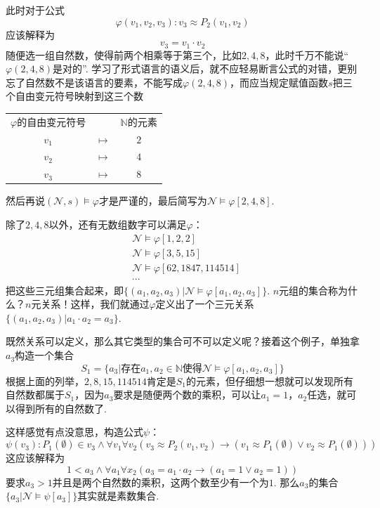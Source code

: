 此时对于公式
\[\varphi(v_1,v_2,v_3): v_3 \approx P_2(v_1,v_2)\]
应该解释为
\[v_3 = v_1 \cdot v_2\]
随便选一组自然数，使得前两个相乘等于第三个，比如\(2,4,8\)，此时千万不能说“\(\varphi(2,4,8)\)是对的”. 学习了形式语言的语义后，就不应轻易断言公式的对错，更别忘了自然数不是该语言的要素，不能写成\(\varphi(2,4,8)\)，而应当规定赋值函数\(s\)把三个自由变元符号映射到这三个数
\begin{center}
    \begin{tabular}{ccc}
        \(\varphi\)的自由变元符号 & & \(\mathbb{N}\)的元素 \\
        \(v_1\) & \(\longmapsto\) & \(2\) \\
        \(v_2\) & \(\longmapsto\) & \(4\) \\
        \(v_3\) & \(\longmapsto\) & \(8\)
    \end{tabular}
\end{center}
然后再说\((\mathcal{N},s) \vDash \varphi\)才是严谨的，最后简写为\(\mathcal{N}\vDash \varphi[2,4,8]\). 

除了\(2,4,8\)以外，还有无数组数字可以满足\(\varphi\)：
\begin{align*}
    & \mathcal{N} \vDash \varphi[1,2,2] \\
    & \mathcal{N} \vDash \varphi[3,5,15] \\
    & \mathcal{N} \vDash \varphi[62,1847,114514] \\
    & \cdots
\end{align*}
把这些三元组集合起来，即\(\{(a_1,a_2,a_3)|\mathcal{N} \vDash \varphi[a_1,a_2,a_3]\}\). \(n\)元组的集合称为什么？\(n\)元关系！这样，我们就通过\(\varphi\)定义出了一个三元关系\(\{(a_1,a_2,a_3)|a_1 \cdot a_2 = a_3\}\).

既然关系可以定义，那么其它类型的集合可不可以定义呢？接着这个例子，单独拿\(a_3\)构造一个集合
\[S_1 = \{a_3|\mbox{存在}a_1,a_2 \in \mathbb{N}\mbox{使得}\mathcal{N} \vDash \varphi[a_1,a_2,a_3]\}\]
根据上面的列举，\(2,8,15,114514\)肯定是\(S_1\)的元素，但仔细想一想就可以发现所有自然数都属于\(S_1\)，因为\(a_3\)要求是随便两个数的乘积，可以让\(a_1=1\)，\(a_2\)任选，就可以得到所有的自然数了. 

这样感觉有点没意思，构造公式\(\psi\)：
\[\psi(v_3): P_1(\emptyset) \in v_3 \wedge \forall v_1 \forall v_2(v_3 \approx P_2(v_1,v_2) \to (v_1 \approx P_1(\emptyset) \vee v_2 \approx P_1(\emptyset)))\]
这应该解释为
\[1 < a_3 \wedge \forall a_1 \forall x_2 (a_3=a_1 \cdot a_2 \to (a_1=1 \vee a_2=1))\]
要求\(a_3>1\)并且是两个自然数的乘积，这两个数至少有一个为\(1\). 那么\(a_3\)的集合\(\{a_3|\mathcal{N} \vDash \psi[a_3]\}\)其实就是素数集合.

